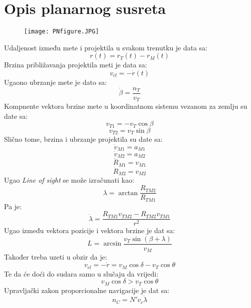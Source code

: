 \section{Opis planarnog susreta}
\begin{figure}[h!]
    \centering
    \texttt{[image: PNfigure.JPG]}
\end{figure}
\noindent Udaljenost između mete i projektila u svakom trenutku je data sa:
\begin{equation}
    r(t)=r_T(t)-r_M(t)
\end{equation}
Brzina približavanja projektila meti je data sa: 
\begin{equation}
    v_{cl}=-\dot{r}(t)
\end{equation}
Ugaono ubrzanje mete je dato sa:
\begin{equation}
    \dot{\beta}=\frac{n_T}{v_T}
\end{equation}
Kompnente vektora brzine mete u koordinatnom sistemu vezanom za zemlju su date sa:
\begin{equation}
    v_{T1}=-v_T\cos{\beta}
\end{equation}
\begin{equation}
    v_{T2}=v_T\sin{\beta}
\end{equation}
Slično tome, brzina i ubrzanje projektila su date sa:
\begin{equation}
    \dot{v}_{M1}=a_{M1}
\end{equation}
\begin{equation}
    \dot{v}_{M2}=a_{M2}
\end{equation}
\begin{equation}
    \dot{R}_{M1}=v_{M1}
\end{equation}
\begin{equation}
    \dot{R}_{M2}=v_{M2}
\end{equation}
Ugao \textit{Line of sight} se može izračunati kao:
\begin{equation}
    \lambda = \arctan{\frac{R_{TM2}}{R_{TM1}}}
\end{equation}
Pa je: 
\begin{equation}
    \dot{\lambda}=\frac{R_{TM1}v_{TM2}-R_{TM2}v_{TM1}}{r^2}
\end{equation}
Ugao između vektora pozicije i vektora brzine je dat sa:
\begin{equation}
    L=\arcsin{\frac{v_T\sin{(\beta+\lambda)}}{v_M}}
\end{equation}
Također treba uzeti u obzir da je:
\begin{equation}
    v_{cl}=-\dot{r}=v_M\cos\delta - v_T\cos\theta
\end{equation}
Te da će doći do sudara samo u slučaju da vrijedi: 
\begin{equation}
    v_M\cos\delta > v_T\cos\theta
\end{equation}
Upravljački zakon proporcionalne navigacije je dat sa:
\begin{equation}
    n_C=N'v_c\dot{\lambda}
\end{equation}

